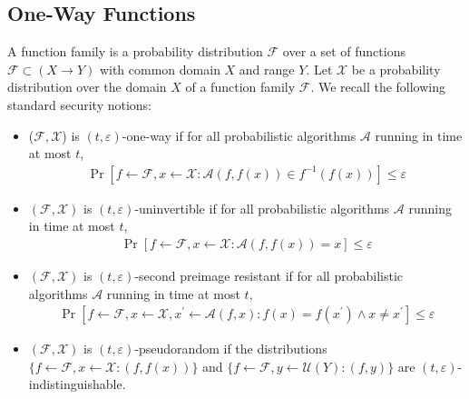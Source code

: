\documentclass[a4paper]{article}
\theoremstyle{definition}
\theoremstyle{remark}
\renewcommand{\epsilon}{\varepsilon}
\begin{document}
\subsection{One-Way Functions}
A function family is a probability distribution $\mathcal{F}$ over a 
set of functions $\mathcal{F} \subset (X \rightarrow Y)$ with common domain 
$X$ and range $Y$.
Let $\mathcal{X}$ be a probability distribution over the domain $X$ of a 
function family $\mathcal{F}$. We recall the following standard security 
notions: 
\begin{itemize}
  \item ($\mathcal{F}, \mathcal{X}$) is $(t, \epsilon)$-one-way if for all probabilistic algorithms $\mathcal{A}$
  running in time at most $t$,
  \begin{gather*}
    \operatorname{Pr}\left[f \leftarrow \mathcal{F}, x \leftarrow \mathcal{X}: \mathcal{A}(f, f(x)) \in f^{-1}(f(x))\right] \leq \epsilon
  \end{gather*}
\item $(\mathcal{F}, \mathcal{X})$ is $(t, \epsilon)$-uninvertible if for all probabilistic algorithms $\mathcal{A}$ 
running in time at most $t$,
\begin{gather*}
  \operatorname{Pr}[f \leftarrow \mathcal{F}, x \leftarrow \mathcal{X}: \mathcal{A}(f, f(x))=x] \leq \epsilon
\end{gather*}
\item $(\mathcal{F}, \mathcal{X})$ is $(t, \epsilon)$-second preimage resistant if for all probabilistic algorithms $\mathcal{A}$ 
running in time at most $t$,
\begin{gather*}
  \operatorname{Pr}\left[f \leftarrow \mathcal{F}, x \leftarrow \mathcal{X}, x^{\prime} \leftarrow \mathcal{A}(f, x): f(x)=f\left(x^{\prime}\right) \wedge x \neq x^{\prime}\right] \leq \epsilon
\end{gather*}
\item $(\mathcal{F}, \mathcal{X})$ is $(t, \epsilon)$-pseudorandom if the distributions $\{f \leftarrow \mathcal{F}, x \leftarrow \mathcal{X}:(f, f(x))\}$
and $\{f \leftarrow \mathcal{F}, y \leftarrow \mathcal{U}(Y):(f, y)\}$ are $(t, \epsilon)$-indistinguishable.
\end{itemize}
\end{document}
